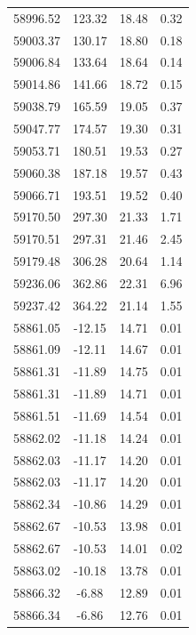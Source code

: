 \begin{longtable}{|c|c|c|c|}
 58996.52 &  123.32 &       18.48 &          0.32 \\
 59003.37 &  130.17 &       18.80 &          0.18 \\
 59006.84 &  133.64 &       18.64 &          0.14 \\
 59014.86 &  141.66 &       18.72 &          0.15 \\
 59038.79 &  165.59 &       19.05 &          0.37 \\
 59047.77 &  174.57 &       19.30 &          0.31 \\
 59053.71 &  180.51 &       19.53 &          0.27 \\
 59060.38 &  187.18 &       19.57 &          0.43 \\
 59066.71 &  193.51 &       19.52 &          0.40 \\
 59170.50 &  297.30 &       21.33 &          1.71 \\
 59170.51 &  297.31 &       21.46 &          2.45 \\
 59179.48 &  306.28 &       20.64 &          1.14 \\
 59236.06 &  362.86 &       22.31 &          6.96 \\
 59237.42 &  364.22 &       21.14 &          1.55 \\
 58861.05 &  -12.15 &       14.71 &          0.01 \\
 58861.09 &  -12.11 &       14.67 &          0.01 \\
 58861.31 &  -11.89 &       14.75 &          0.01 \\
 58861.31 &  -11.89 &       14.71 &          0.01 \\
 58861.51 &  -11.69 &       14.54 &          0.01 \\
 58862.02 &  -11.18 &       14.24 &          0.01 \\
 58862.03 &  -11.17 &       14.20 &          0.01 \\
 58862.03 &  -11.17 &       14.20 &          0.01 \\
 58862.34 &  -10.86 &       14.29 &          0.01 \\
 58862.67 &  -10.53 &       13.98 &          0.01 \\
 58862.67 &  -10.53 &       14.01 &          0.02 \\
 58863.02 &  -10.18 &       13.78 &          0.01 \\
 58866.32 &   -6.88 &       12.89 &          0.01 \\
 58866.34 &   -6.86 &       12.76 &          0.01 \\

\end{longtable}

